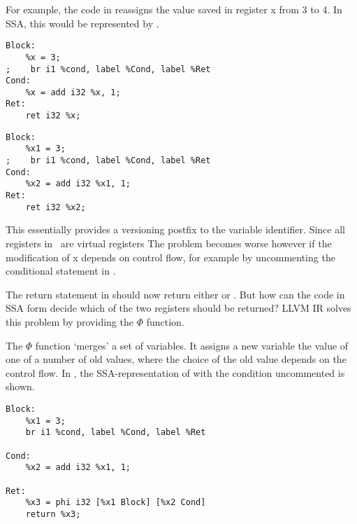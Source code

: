 \begin{description}
For example, the code in  reassigns the value saved in register x from 3 to  4. In SSA, this would be represented by .
\begin{lstlisting}[label=lst:reassign, caption={[Variable Reassignment]Reassigning a variable.}, frame=single, language={[x86masm]Assembler}]
Block:
    %x = 3;
;    br i1 %cond, label %Cond, label %Ret
Cond:
    %x = add i32 %x, 1;
Ret:
    ret i32 %x;
\end{lstlisting}

\begin{lstlisting}[label=lst:ssa, caption={[SSA Representation 1]Code in SSA form.}, frame=single, language={[x86masm]Assembler}]
Block:
    %x1 = 3;
;    br i1 %cond, label %Cond, label %Ret
Cond:
    %x2 = add i32 %x1, 1;
Ret:
    ret i32 %x2;
\end{lstlisting}
This essentially provides a versioning postfix to the variable identifier. 
Since all registers in \LLVMIR\ are virtual registers
The problem becomes worse however if the modification of x depends on control flow, for example by uncommenting the conditional statement in .

The return statement in  should now return either  or .
But how can the code in SSA form decide which of the two registers should be returned?
LLVM IR solves this problem by providing the $\Phi$ function\cite{Appel}.

The $\Phi$ function `merges' a set of variables.
It assigns a new variable the value of one of a number of old values, where the choice of the old value depends on the control flow.
In , the SSA-representation of  with the condition uncommented is shown.

\begin{lstlisting}[label=lst:ssaphi, caption={[SSA Representation 2]Code in SSA form with function.}, frame=single, language={[x86masm]Assembler}]
Block:
    %x1 = 3;
    br i1 %cond, label %Cond, label %Ret

Cond:
    %x2 = add i32 %x1, 1;
    
Ret:
    %x3 = phi i32 [%x1 Block] [%x2 Cond]
    return %x3;
\end{lstlisting}


\end{description}

